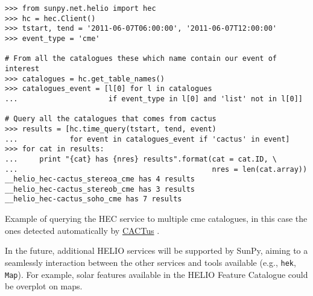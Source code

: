 \begin{listing}[h]
\begin{verbatim}
>>> from sunpy.net.helio import hec
>>> hc = hec.Client()
>>> tstart, tend = '2011-06-07T06:00:00', '2011-06-07T12:00:00'
>>> event_type = 'cme'

# From all the catalogues these which name contain our event of interest
>>> catalogues = hc.get_table_names()
>>> catalogues_event = [l[0] for l in catalogues 
...                     if event_type in l[0] and 'list' not in l[0]]

# Query all the catalogues that comes from cactus
>>> results = [hc.time_query(tstart, tend, event) 
...            for event in catalogues_event if 'cactus' in event]
>>> for cat in results:
...     print "{cat} has {nres} results".format(cat = cat.ID, \
...                                             nres = len(cat.array))
__helio_hec-cactus_stereoa_cme has 4 results
__helio_hec-cactus_stereob_cme has 3 results
__helio_hec-cactus_soho_cme has 7 results
\end{verbatim}
\caption{Example of querying the HEC service to multiple cme
catalogues, in this case the ones detected automatically 
by \href{http://sidc.oma.be/cactus/}{CACTus} \citep{robbrecht_automated_2009}.}
\label{code:helio}
\end{listing}

In the future, additional HELIO services will be supported by SunPy, aiming to a 
seamlessly interaction between the other services and tools available (e.g., 
\texttt{hek}, \texttt{Map}).  
For example, solar features available in the HELIO Feature Catalogue could be
overplot on maps.
